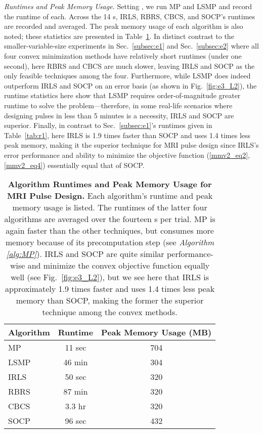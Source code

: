 \documentclass[final]{siamltex}
\begin{document}
   {\em{Runtimes and Peak Memory Usage}.} Setting , we run MP
   and LSMP and record the runtime of each.  Across the 14 s,
   IRLS, RBRS, CBCS, and SOCP's runtimes are recorded and averaged.
   The peak memory usage of each algorithm is also noted; these
   statistics are presented in Table~\ref{tab:r3}.  In distinct
   contrast to the smaller-variable-size experiments in
   Sec.~\ref{subsec:e1} and Sec.~\ref{subsec:e2} where all four convex
   minimization methods have relatively short runtimes (under one
   second), here RBRS and CBCS are much slower, leaving IRLS and SOCP
   as the only feasible techniques among the four.  Furthermore, while
   LSMP does indeed outperform IRLS and SOCP on an  error
   basis (as shown in Fig.~\ref{fig:e3_L2}), the runtime statistics
   here show that LSMP requires order-of-magnitude greater runtime to
   solve the problem---therefore, in some real-life scenarios where
   designing pulses in less than 5 minutes is a necessity, IRLS and
   SOCP are superior.  Finally, in contrast to Sec.~\ref{subsec:e1}'s
   runtimes given in Table~\ref{tab:r1}, here IRLS is 1.9 times faster
   than SOCP and uses 1.4 times less peak memory, making it the
   superior technique for MRI pulse design since IRLS's  error
   performance and ability to minimize the objective function
   (\ref{mmv2_eq2}, \ref{mmv2_eq4}) essentially equal that of SOCP\@.
   \begin{table}
   \begin{center}
   \small
   \begin{tabular}{|l|c|c|}
   \hline
    {\bf{Algorithm}}   & {\bf{Runtime}} & {\bf{Peak Memory Usage (MB)}} \\ \hline
    MP               & 11 sec            & 704      \\
    LSMP             & 46 min            & 304      \\
    IRLS             & 50 sec            & 320      \\
    RBRS             & 87 min            & 320      \\
    CBCS             & 3.3 hr            & 320      \\
    SOCP             & 96 sec            & 432      \\ \hline
   \end{tabular}
   \end{center}

   \caption{{\bf{Algorithm Runtimes and Peak Memory Usage for MRI
   Pulse Design.}}  Each algorithm's runtime and peak memory usage is
   listed.  The runtimes of the latter four algorithms are averaged
   over the fourteen s per trial.  MP is again faster than
   the other techniques, but consumes more memory because of its
   precomputation step (see {\em{Algorithm \ref{alg:MP}}}).  IRLS and
   SOCP are quite similar performance-wise and minimize the convex
   objective function equally well (see Fig.~\ref{fig:e3_L2}), but we
   see here that IRLS is approximately 1.9 times faster and uses 1.4
   times less peak memory than SOCP, making the former the superior
   technique among the convex methods.}  \label{tab:r3}

   \end{table}
\end{document}
